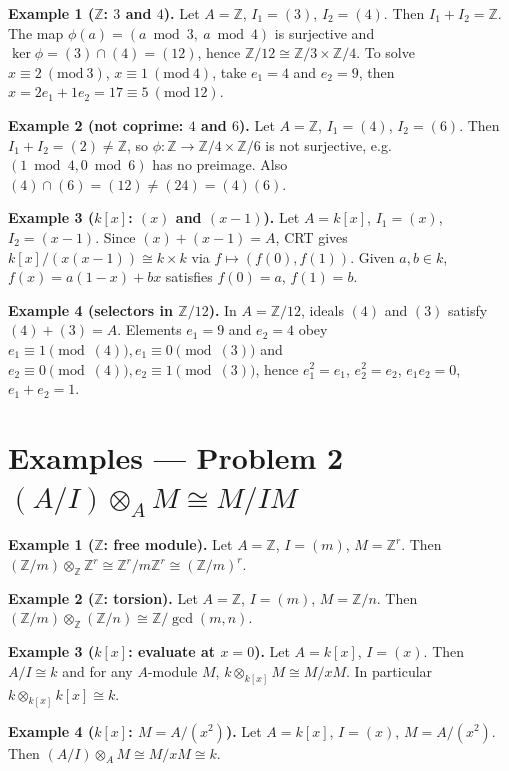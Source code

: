 \documentclass[12pt,a4paper]{article}
\theoremstyle{plain}
\theoremstyle{definition}      %
\begin{document}
	\textbf{Example 1 (\(\mathbb Z\): \(3\) and \(4\)).}
	Let \(A=\mathbb Z\), \(I_1=(3)\), \(I_2=(4)\). Then \(I_1+I_2=\mathbb Z\).
	The map \(\phi(a)=(a\bmod 3,\ a\bmod 4)\) is surjective and
	\(\ker\phi=(3)\cap(4)=(12)\), hence \(\mathbb Z/12\cong \mathbb Z/3\times\mathbb Z/4\).
	To solve \(x\equiv2\ (\mathrm{mod}\ 3)\), \(x\equiv1\ (\mathrm{mod}\ 4)\), take
	\(e_1=4\) and \(e_2=9\), then \(x=2e_1+1e_2=17\equiv5\ (\mathrm{mod}\ 12)\).
	
	\medskip
	\textbf{Example 2 (not coprime: \(4\) and \(6\)).}
	Let \(A=\mathbb Z\), \(I_1=(4)\), \(I_2=(6)\). Then \(I_1+I_2=(2)\neq\mathbb Z\),
	so \(\phi:\mathbb Z\to\mathbb Z/4\times\mathbb Z/6\) is not surjective, e.g.
	\((1\bmod4,0\bmod6)\) has no preimage. Also \((4)\cap(6)=(12)\neq(24)=(4)(6)\).
	
	\medskip
	\textbf{Example 3 (\(k[x]\): \((x)\) and \((x-1)\)).}
	Let \(A=k[x]\), \(I_1=(x)\), \(I_2=(x-1)\). Since \((x)+(x-1)=A\),
	CRT gives \(k[x]/(x(x-1))\cong k\times k\) via \(f\mapsto(f(0),f(1))\).
	Given \(a,b\in k\), \(f(x)=a(1-x)+bx\) satisfies \(f(0)=a\), \(f(1)=b\).
	
	\medskip
	\textbf{Example 4 (selectors in \(\mathbb Z/12\)).}
	In \(A=\mathbb Z/12\), ideals \((4)\) and \((3)\) satisfy \((4)+(3)=A\).
	Elements \(e_1=9\) and \(e_2=4\) obey
	\(e_1\equiv1\pmod{(4)}, e_1\equiv0\pmod{(3)}\) and
	\(e_2\equiv0\pmod{(4)}, e_2\equiv1\pmod{(3)}\), hence \(e_1^2=e_1\), \(e_2^2=e_2\),
	\(e_1e_2=0\), \(e_1+e_2=1\).
	
	\section*{Examples — Problem 2 \((A/I)\otimes_A M \cong M/IM\)}
	
	\textbf{Example 1 (\(\mathbb Z\): free module).}
	Let \(A=\mathbb Z\), \(I=(m)\), \(M=\mathbb Z^r\). Then
	\((\mathbb Z/m)\otimes_{\mathbb Z}\mathbb Z^r \cong \mathbb Z^r/m\mathbb Z^r \cong (\mathbb Z/m)^r\).
	
	\medskip
	\textbf{Example 2 (\(\mathbb Z\): torsion).}
	Let \(A=\mathbb Z\), \(I=(m)\), \(M=\mathbb Z/n\). Then
	\((\mathbb Z/m)\otimes_{\mathbb Z}(\mathbb Z/n)\cong \mathbb Z/\gcd(m,n)\).
	
	\medskip
	\textbf{Example 3 (\(k[x]\): evaluate at \(x=0\)).}
	Let \(A=k[x]\), \(I=(x)\). Then \(A/I\cong k\) and for any \(A\)-module \(M\),
	\(k\otimes_{k[x]} M\cong M/xM\). In particular \(k\otimes_{k[x]} k[x]\cong k\).
	
	\medskip
	\textbf{Example 4 (\(k[x]\): \(M=A/(x^2)\)).}
	Let \(A=k[x]\), \(I=(x)\), \(M=A/(x^2)\). Then
	\((A/I)\otimes_A M \cong M/xM \cong k.
	\)
	
\end{document}

